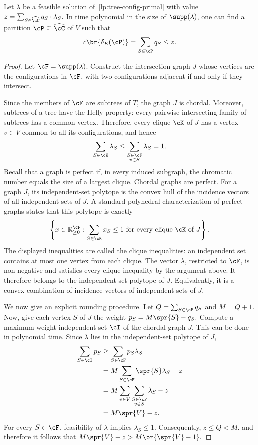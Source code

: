 \begin{theorem}\label{thm:tree-config-lossless-rounding}
    Let $\lambda$ be a feasible solution of~\eqref{lp:tree-config-primal} with value $
        z=\sum_{S\in\widehat\cC}q_S\cdot\lambda_S.
    $
    In time polynomial in the size of $\supp(\lambda)$, one can find a partition $\cP\subseteq\widehat\cC$ of $V$ such that
    \[
        c\br{\delta_E(\cP)}
        =\sum_{S\in\cP}q_S
        \leq z.
    \]
\end{theorem}
\begin{proof}
    Let $\cF=\supp(\lambda)$. Construct the intersection graph $J$ whose vertices are the configurations in $\cF$, with two configurations adjacent if and only if they intersect.

    Since the members of $\cF$ are subtrees of $T$, the graph $J$ is chordal. Moreover, subtrees of a tree have the Helly property: every pairwise-intersecting family of subtrees has a common vertex. Therefore, every clique $\cK$ of $J$ has a vertex $v\in V$ common to all its configurations, and hence
    \[
        \sum_{S\in\cK}\lambda_S
        \leq
        \sum_{\substack{S\in\cF\\v\in S}}\lambda_S
        =1.
    \]
    Recall that a graph is perfect if, in every induced subgraph, the chromatic number equals the size of a largest clique. Chordal graphs are perfect. For a graph $J$, its independent-set polytope is the convex hull of the incidence vectors of all independent sets of $J$. A standard polyhedral characterization of perfect graphs states that this polytope is exactly
    \[
        \left\{
            x\in\mathbb{R}_{\geq0}^{\cF}:
            \sum_{S\in\cK}x_S\leq1
            \text{ for every clique $\cK$ of $J$}
        \right\}.
    \]
    The displayed inequalities are called the clique inequalities: an independent set contains at most one vertex from each clique. The vector $\lambda$, restricted to $\cF$, is non-negative and satisfies every clique inequality by the argument above. It therefore belongs to the independent-set polytope of $J$. Equivalently, it is a convex combination of incidence vectors of independent sets of $J$.

    We now give an explicit rounding procedure. Let $
        Q=\sum_{S\in\cF}q_S$ and $M=Q+1$. Now, give each vertex $S$ of $J$ the weight $
        p_S=M\spr{S}-q_S.$
    Compute a maximum-weight independent set $\cI$ of the chordal graph $J$. This can be done in polynomial time. Since $\lambda$ lies in the independent-set polytope of $J$,
    \begin{align*}
        \sum_{S\in\cI}p_S
        &\geq\sum_{S\in\cF}p_S\lambda_S\\
        &=M\sum_{S\in\cF}\spr{S}\lambda_S-z\\
        &=M\sum_{v\in V}\sum_{\substack{S\in\cF\\v\in S}}\lambda_S-z\\
        &=M\spr{V}-z.
    \end{align*}
    For every $S\in\cF$, feasibility of $\lambda$ implies $\lambda_S\leq1$. Consequently, $
        z\leq Q<M.$ and therefore it follows that $
        M\spr{V}-z>M\br{\spr{V}-1}.$


\end{proof}
